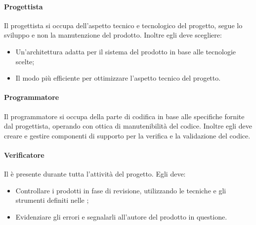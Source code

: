 \paragraph{Progettista}
Il progettista si occupa dell'aspetto tecnico e tecnologico del progetto, segue lo sviluppo e non la manutenzione del prodotto. Inoltre egli deve scegliere: 
\begin{itemize}
\item Un'architettura adatta per il sistema del prodotto in base alle tecnologie scelte;
\item Il modo più efficiente per ottimizzare l'aspetto tecnico del progetto.
\end{itemize}

\paragraph{Programmatore}
Il programmatore si occupa della parte di codifica in base alle specifiche fornite dal progettista, operando con ottica di manutenibilità del codice. Inoltre egli deve creare e gestire componenti di supporto per la verifica e la validazione del codice. 

\paragraph{Verificatore}
Il  è presente durante tutta l'attività del progetto. Egli deve: 
\begin{itemize}
\item Controllare i prodotti in fase di revisione, utilizzando le tecniche e gli strumenti definiti nelle \NdP{}; 
\item Evidenziare gli errori e segnalarli all'autore del prodotto in questione.
\end{itemize}
